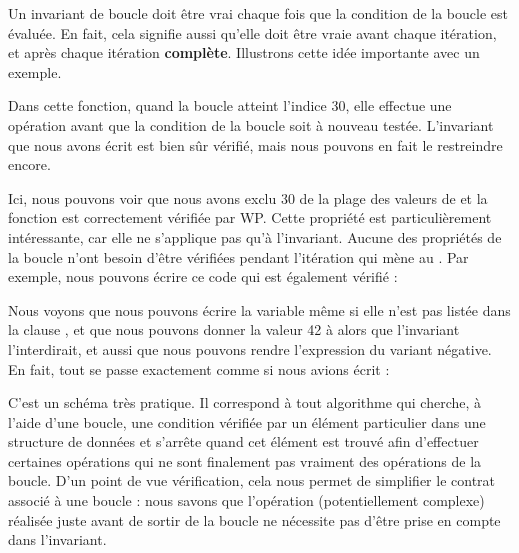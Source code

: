 Un invariant de boucle doit être vrai chaque fois que la condition de la boucle est
évaluée. En fait, cela signifie aussi qu'elle doit être vraie avant chaque itération,
et après chaque itération \textbf{complète}. Illustrons cette idée importante avec un
exemple.




Dans cette fonction, quand la boucle atteint l'indice 30, elle effectue une opération
 avant que la condition de la boucle soit à nouveau testée.
L'invariant que nous avons écrit est bien sûr vérifié, mais nous pouvons en fait le
restreindre encore.






Ici, nous pouvons voir que nous avons exclu 30 de la plage des valeurs de
 et la fonction est correctement vérifiée par WP. Cette propriété
est particulièrement intéressante, car elle ne s'applique pas qu'à l'invariant.
Aucune des propriétés de la boucle n'ont besoin d'être vérifiées pendant l'itération
qui mène au . Par exemple, nous pouvons écrire ce code qui est
également vérifié :





Nous voyons que nous pouvons écrire la variable  même si elle
n'est pas listée dans la clause , et que nous pouvons
donner la valeur 42 à  alors que l'invariant l'interdirait, et aussi
que nous pouvons rendre l'expression du variant négative. En fait, tout se passe
exactement comme si nous avions écrit :





C'est un schéma très pratique. Il correspond à tout algorithme qui cherche, à l'aide
d'une boucle, une condition vérifiée par un élément particulier dans une structure
de données et s'arrête quand cet élément est trouvé afin d'effectuer certaines
opérations qui ne sont finalement pas vraiment des opérations de la boucle. D'un
point de vue vérification, cela nous permet de simplifier le contrat associé à
une boucle : nous savons que l'opération (potentiellement complexe) réalisée
juste avant de sortir de la boucle ne nécessite pas d'être prise en compte dans
l'invariant.



